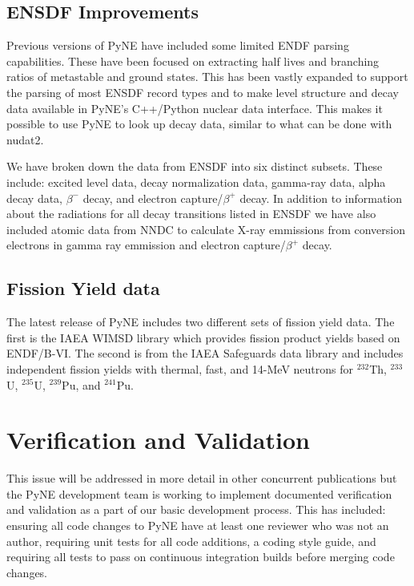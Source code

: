 \documentclass{anstrans}
\begin{document}
\subsection{ENSDF Improvements}

Previous versions of PyNE have included some limited ENDF parsing capabilities. 
These have been focused on extracting half lives and branching ratios of 
metastable and ground states. This has been vastly expanded to support the 
parsing of most ENSDF record types and to make level structure and decay data 
available in PyNE's C++/Python nuclear data interface. This makes it possible 
to use PyNE to look up decay data, similar to what can be done with nudat2. 

We have broken down the data from ENSDF into six distinct subsets. These 
include: excited level data, decay normalization data, gamma-ray data, alpha 
decay data, $\beta^-$ decay, and electron capture/$\beta^+$ decay. In addition 
to information about the radiations for all decay transitions listed in ENSDF we 
have also included atomic data from NNDC to calculate X-ray emmissions from 
conversion electrons in gamma ray emmission and electron capture/$\beta^+$ decay.

\subsection{Fission Yield data}

The latest release of PyNE includes two different sets of fission yield data. 
The first is the IAEA WIMSD library which provides fission product yields 
based on ENDF/B-VI. The second is from the IAEA Safeguards data library and includes 
independent fission yields with thermal, fast, and 14-MeV neutrons for $^{232}$Th, 
$^{233}$U, $^{235}$U, $^{239}$Pu, and $^{241}$Pu.

\section{Verification and Validation}

This issue will be addressed in more detail in other concurrent publications 
but the PyNE development team is working to implement documented verification 
and validation as a part of our basic development process. This has included: 
ensuring all code changes to PyNE have at least one reviewer who was not an 
author, requiring unit tests for all code additions, a coding style guide, 
and requiring all tests to pass on continuous integration builds before 
merging code changes. 
\end{document}
